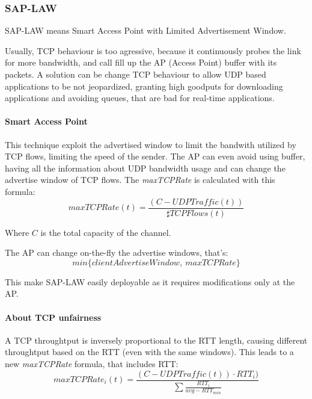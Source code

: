 \subsubsection{SAP-LAW}

SAP-LAW means Smart Access Point with Limited Advertisement Window.

Usually, TCP behaviour is too agressive, because it continuously probes the link
for more bandwidth, and call fill up the AP (Access Point) buffer with its
packets. A solution can be change TCP behaviour to allow UDP based applications
to be not jeopardized, granting high goodputs for downloading applications and
avoiding queues, that are bad for real-time applications.

\paragraph*{Smart Access Point} This technique exploit the advertised window to
limit the bandwith utilized by TCP flows, limiting the speed of the sender. The AP can even avoid using buffer, having all the information about UDP bandwidth usage and can change the advertise window of TCP flows. The \textit{maxTCPRate} is calculated with this formula:
\begin{equation}
  maxTCPRate(t) = \frac{(C - UDPTraffic(t))}{\sharp TCPFlows(t)}
\end{equation}

Where $C$ is the total capacity of the channel.

The AP can change on-the-fly the advertise windows, that's:
\begin{equation*}
  min \{clientAdvertiseWindow,\ maxTCPRate \}
\end{equation*}

This make SAP-LAW easily deployable as it requires modifications only at the AP.

\paragraph*{About TCP unfairness} A TCP throughtput is inversely proportional to the RTT length, causing different throughtput based on the RTT (even with the same windows). This leads to a new \textit{maxTCPRate} formula, that includes RTT:
\begin{equation}
maxTCPRate_{i}(t) = \frac{(C - UDPTraffic(t)) \cdot RTT_i)}{\sum \frac{RTT_i}{avg - RTT_{min}}}
\end{equation}

